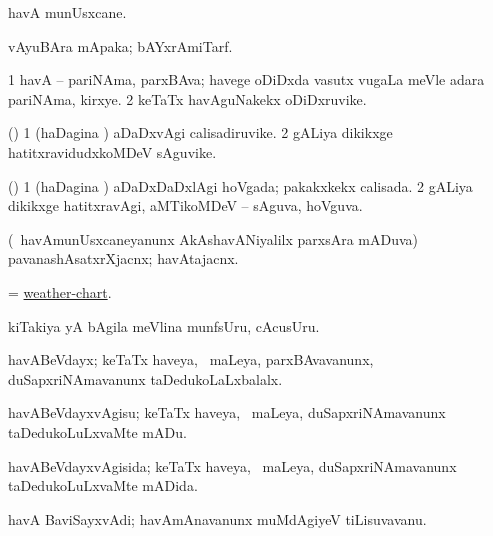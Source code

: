 \bentry
{} 
\gl{\nA}
\expl{}
\bmng
havA munUsxcane. 
\emng
\eentry

\bentry
{} 
\gl{\nA}
\expl{}
\bmng
vAyuBAra mApaka; bAYxrAmiTarf. 
\emng
\eentry

\bentry
{} 
\gl{\nA}
\expl{}
\bmng
\bnum
\num{1} havA -- pariNAma, parxBAva; havege oDiDxda vasutx \mo vugaLa meVle adara pariNAma, kirxye. 
\num{2} keTaTx havAguNakekx oDiDxruvike. 
\enum
\emng
\eentry

\bentry
{} 
\gl{\nA}
\expl{}
\bmng
(\nw) 
\bnum
\num{1} (haDagina \vi) aDaDxvAgi calisadiruvike. 
\num{2} gALiya dikikxge hatitxravidudxkoMDeV sAguvike. 
\enum
\emng
\eentry

\bentry
{} 
\gl{\gu}
\expl{}
\bmng
(\nw) 
\bnum
\num{1} (haDagina \vi) aDaDxDaDxlAgi hoVgada; pakakxkekx calisada. 
\num{2} gALiya dikikxge hatitxravAgi, aMTikoMDeV -- sAguva, hoVguva. 
\enum
\emng
\eentry

\bentry
{} 
\gl{\nA}
\bmng
(\kanmu\ havAmunUsxcaneyanunx AkAshavANiyalilx parxsAra mADuva) pavanashAsatxrXjacnx; havAtajacnx. 
\emng
\eentry

\bentry
{} 
\gl{\nA}
\expl{}
\bmng
= \hyperlink{weather-chart}{weather-chart}. 
\emng
\eentry

\bentry
{} 
\gl{\nA}
\expl{}
\bmng
kiTakiya yA bAgila meVlina munfsUru, cAcusUru. 
\emng
\eentry

\bentry
{} 
\gl{\gu}
\expl{}
\bmng
havABeVdayx; keTaTx haveya, \kanmu\ maLeya, parxBAvavanunx, duSapxriNAmavanunx taDedukoLaLxbalalx. 
\emng
\eentry

\bentry
{} 
\gl{\sakirx}
\expl{}
\bmng
havABeVdayxvAgisu; keTaTx haveya, \kanmu\ maLeya, duSapxriNAmavanunx taDedukoLuLxvaMte mADu. 
\emng
\eentry

\bentry
{} 
\gl{\gu}
\expl{}
\bmng
havABeVdayxvAgisida; keTaTx haveya, \kanmu\ maLeya, duSapxriNAmavanunx taDedukoLuLxvaMte mADida. 
\emng
\eentry

\bentry
{} 
\gl{\nA}
\expl{}
\bmng
havA BaviSayxvAdi; havAmAnavanunx muMdAgiyeV tiLisuvavanu. 
\emng
\eentry

